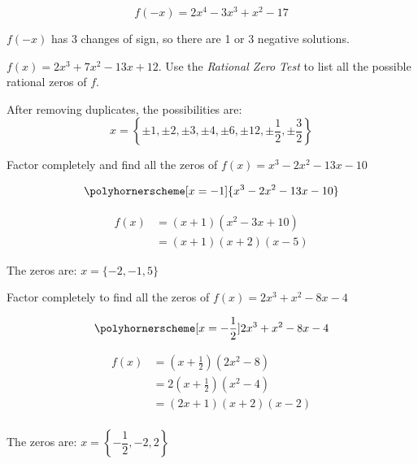 \documentclass[fleqn,addpoints]{exam}
\begin{document}
\begin{questions}
\begin{parts}
\begin{solution}[3 cm]
\[
  f(-x) = 2x^4 - 3x^3 + x^2 - 17
\]

$f(-x)$ has 3 changes of sign, so there are 1 or 3 negative solutions.

\end{solution}
\end{parts}

\question[5]
$f(x) = 2x^3 + 7x^2 - 13x + 12$.  Use the {\em Rational Zero Test} to list all the possible rational zeros of $f$.

\begin{solution}[3 cm]
  After removing duplicates, the possibilities are:
\[
  x = \left \{ \pm 1, \pm 2, \pm 3, \pm 4, \pm 6, \pm 12, \pm \dfrac{1}{2}, \pm \dfrac{3}{2} \right \}
\]

\end{solution}

\question[10]
Factor completely and find all the zeros of $f(x) = x^3 - 2x^2 - 13x - 10$

\begin{solution}[8 cm]
\[ 
  \polyhornerscheme[x=-1]{x^3 - 2x^2 - 13x - 10}
\]

\begin{align*}
  f(x) &= (x+1)(x^2-3x+10) \\
       &= (x+1)(x+2)(x-5)
\end{align*}

The zeros are: $x = \{-2, -1, 5\}$

\end{solution}

\question[10]
Factor completely to find all the zeros of $f(x) = 2x^3 + x^2 - 8x - 4$

\begin{solution}[8 cm]
\[ 
  \polyhornerscheme[x=-\frac{1}{2}]{2x^3 + x^2 - 8x - 4}
\]

\begin{align*}
  f(x) &= \left( x+\frac{1}{2} \right) (2x^2-8) \\
       &= 2 \left( x+\frac{1}{2} \right) (x^2-4) \\
       &= (2x+1)(x+2)(x-2) \\
\end{align*}

The zeros are: $x = \left \{ -\dfrac{1}{2}, -2, 2 \right \}$

\end{solution}

\ifprintanswers
\else
\pagebreak 
\fi


\end{questions}
\end{document}
